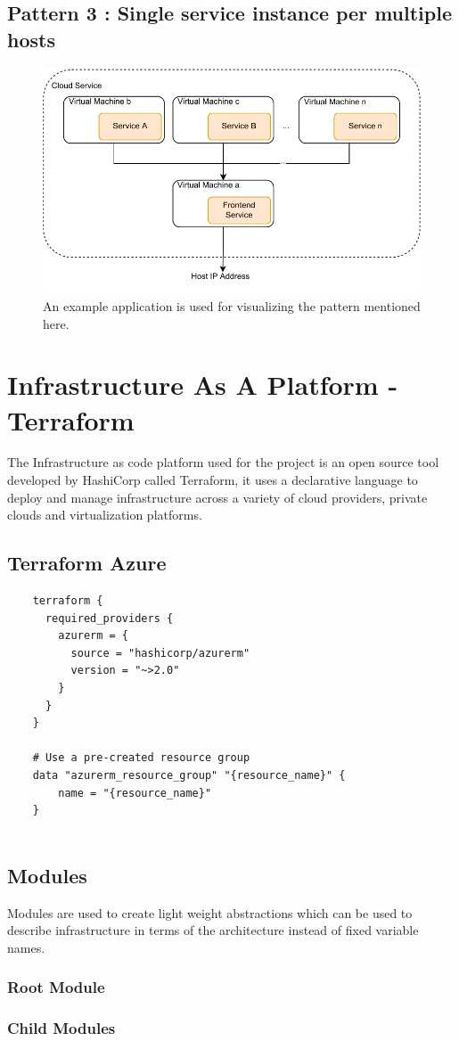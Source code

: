 \subsection{Pattern 3 : Single service instance per multiple hosts}
    \begin{figure}[H]
        \centering
        \includegraphics[width=0.8\linewidth]{images/Pattern-3.pdf}
        \caption{An example application is used for visualizing the pattern mentioned here.}
    \end{figure}  



\section{Infrastructure As A Platform -Terraform}

The Infrastructure as code platform used for the project is an open source tool developed by HashiCorp called Terraform, it uses a declarative language to deploy and manage infrastructure across a variety of cloud providers, private clouds and virtualization platforms. 


\subsection{Terraform Azure}
\begin{lstlisting}
    terraform {
      required_providers {
        azurerm = {
          source = "hashicorp/azurerm"
          version = "~>2.0"
        }
      }
    }
    
    # Use a pre-created resource group
    data "azurerm_resource_group" "{resource_name}" {
    	name = "{resource_name}"
    }
    
\end{lstlisting}

\subsection{Modules}
Modules are used to create light weight abstractions which can be used to describe infrastructure in terms of the architecture instead of fixed variable names. 
\subsubsection{Root Module}
\subsubsection{Child Modules}
